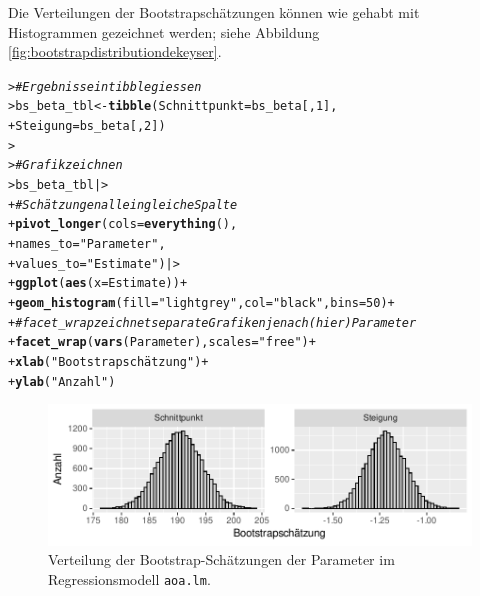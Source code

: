 \documentclass[oneside, 10pt]{book}\usepackage[]{graphicx}\usepackage[]{xcolor}
\makeatletter
\newcommand{\hlnum}[1]{\textcolor[rgb]{0.686,0.059,0.569}{#1}}%
\newcommand{\hlstr}[1]{\textcolor[rgb]{0.192,0.494,0.8}{#1}}%
\newcommand{\hlcom}[1]{\textcolor[rgb]{0.678,0.584,0.686}{\textit{#1}}}%
\newcommand{\hlopt}[1]{\textcolor[rgb]{0,0,0}{#1}}%
\newcommand{\hlstd}[1]{\textcolor[rgb]{0.345,0.345,0.345}{#1}}%
\newcommand{\hlkwb}[1]{\textcolor[rgb]{0.69,0.353,0.396}{#1}}%
\newcommand{\hlkwc}[1]{\textcolor[rgb]{0.333,0.667,0.333}{#1}}%
\newcommand{\hlkwd}[1]{\textcolor[rgb]{0.737,0.353,0.396}{\textbf{#1}}}%
\newenvironment{kframe}{%
 \def\at@end@of@kframe{}%
 \ifinner\ifhmode%
  \def\at@end@of@kframe{\end{minipage}}%
  \begin{minipage}{\columnwidth}%
 \fi\fi%
 \def\FrameCommand##1{\hskip\@totalleftmargin \hskip-\fboxsep
 \colorbox{shadecolor}{##1}\hskip-\fboxsep
     \hskip-\linewidth \hskip-\@totalleftmargin \hskip\columnwidth}%
 \MakeFramed {\advance\hsize-\width
   \@totalleftmargin\z@ \linewidth\hsize
   \@setminipage}}%
 {\par\unskip\endMakeFramed%
 \at@end@of@kframe}
\newenvironment{knitrout}{}{} %
\makeatother
\begin{document}
Die Verteilungen der Bootstrapschätzungen können wie gehabt
mit Histogrammen gezeichnet werden; siehe Abbildung \ref{fig:bootstrapdistributiondekeyser}.\label{sec:histogrammebootstrapdekeyser}

\begin{knitrout}
\color{fgcolor}\begin{kframe}
\begin{alltt}
\hlstd{> }\hlcom{# Ergebnisse in tibble giessen}
\hlstd{> }\hlstd{bs_beta_tbl} \hlkwb{<-} \hlkwd{tibble}\hlstd{(}\hlkwc{Schnittpunkt} \hlstd{= bs_beta[,} \hlnum{1}\hlstd{],}
\hlstd{+ }                      \hlkwc{Steigung} \hlstd{= bs_beta[,} \hlnum{2}\hlstd{])}
\hlstd{> }
\hlstd{> }\hlcom{# Grafik zeichnen}
\hlstd{> }\hlstd{bs_beta_tbl |>}
\hlstd{+ }  \hlcom{# Schätzungen alle in gleiche Spalte}
\hlstd{+ }  \hlkwd{pivot_longer}\hlstd{(}\hlkwc{cols} \hlstd{=} \hlkwd{everything}\hlstd{(),}
\hlstd{+ }               \hlkwc{names_to} \hlstd{=} \hlstr{"Parameter"}\hlstd{,}
\hlstd{+ }               \hlkwc{values_to} \hlstd{=} \hlstr{"Estimate"}\hlstd{) |>}
\hlstd{+ }  \hlkwd{ggplot}\hlstd{(}\hlkwd{aes}\hlstd{(}\hlkwc{x} \hlstd{= Estimate))} \hlopt{+}
\hlstd{+ }  \hlkwd{geom_histogram}\hlstd{(}\hlkwc{fill} \hlstd{=} \hlstr{"lightgrey"}\hlstd{,} \hlkwc{col} \hlstd{=} \hlstr{"black"}\hlstd{,} \hlkwc{bins} \hlstd{=} \hlnum{50}\hlstd{)} \hlopt{+}
\hlstd{+ }  \hlcom{# facet_wrap zeichnet separate Grafiken je nach (hier) Parameter}
\hlstd{+ }  \hlkwd{facet_wrap}\hlstd{(}\hlkwd{vars}\hlstd{(Parameter),} \hlkwc{scales} \hlstd{=} \hlstr{"free"}\hlstd{)} \hlopt{+}
\hlstd{+ }  \hlkwd{xlab}\hlstd{(}\hlstr{"Bootstrapschätzung"}\hlstd{)} \hlopt{+}
\hlstd{+ }  \hlkwd{ylab}\hlstd{(}\hlstr{"Anzahl"}\hlstd{)}
\end{alltt}
\end{kframe}\begin{figure}[tp]

{\centering \includegraphics[width=.7\textwidth]{figs/unnamed-chunk-205-1} 

}

\caption{Verteilung der Bootstrap-Schätzungen der Parameter im Regressionsmodell \texttt{aoa.lm}.\label{fig:bootstrapdistributiondekeyser}}\label{fig:unnamed-chunk-205}
\end{figure}

\end{knitrout}
\end{document}
